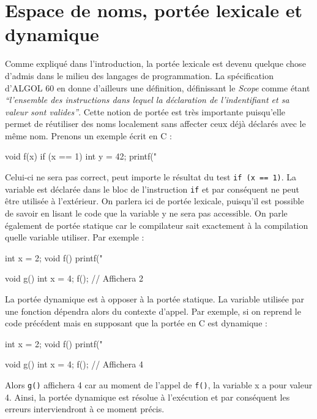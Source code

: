 \documentclass[11pt,a4paper]{report}
\begin{document}
\section{Espace de noms, portée lexicale et dynamique}

Comme expliqué dans l'introduction, la portée lexicale est devenu quelque chose
d'admis dans le milieu des langages de programmation. La spécification d'ALGOL
60 \cite{Naur:1960:RAL:367236.367262} en donne d'ailleurs une définition,
définissant le \emph{Scope} comme étant \emph{``l'ensemble des instructions dans
  lequel la déclaration de l'indentifiant et sa valeur sont
  valides''}. Cette notion de portée est très importante puisqu'elle permet de
réutiliser des noms localement sans affecter ceux déjà déclarés avec le même
nom. Prenons un exemple écrit en C :
\begin{C}
void f(x) {
  if (x == 1) {
    int y = 42;
  }
  printf("%
}
\end{C}
Celui-ci ne sera pas correct, peut importe le résultat du test \texttt{if (x ==
  1)}. La variable est déclarée dans le bloc de l'instruction \texttt{if} et par
conséquent ne peut être utilisée à l'extérieur. On parlera ici de portée
lexicale, puisqu'il est possible de savoir en lisant le code que la variable y
ne sera pas accessible. On parle également de portée statique car le compilateur
sait exactement à la compilation quelle variable utiliser. Par exemple :
\begin{C}
int x = 2;
void f() {
  printf("%
}

void g() {
  int x = 4;
  f(); // Affichera 2
}
\end{C}

La portée dynamique est à opposer à la portée statique. La variable utilisée
par une fonction dépendra alors du contexte d'appel. Par exemple, si on reprend
le code précédent mais en supposant que la portée en C est dynamique :
\begin{C}
int x = 2;
void f() {
  printf("%
}

void g() {
  int x = 4;
  f(); // Affichera 4
}
\end{C}
Alors \texttt{g()} affichera 4 car au moment de l'appel de \texttt{f()}, la
variable x a pour valeur 4. Ainsi, la portée dynamique est résolue à l'exécution
et par conséquent les erreurs interviendront à ce moment précis.
\end{document}
